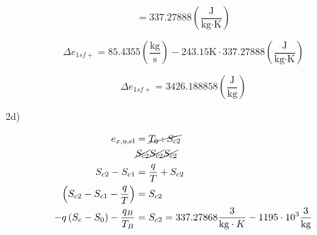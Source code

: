 \[
= 337.27888 \left( \frac{\text{J}}{\text{kg} \cdot \text{K}} \right)
\]

\[
\Delta e_{1sf+} = 85.4355 \left( \frac{\text{kg}}{\text{s}} \right) - 243.15 \text{K} \cdot 337.27888 \left( \frac{\text{J}}{\text{kg} \cdot \text{K}} \right)
\]

\[
\Delta e_{1sf+} = 3426.188858 \left( \frac{\text{J}}{\text{kg}} \right)
\]



2d)

\begin{align*}
e_{x, \text{u,el}} &= \cancel{T_0: S_{c2}} \\
& \cancel{S_{c2}} \cancel{S_{c2}} \cancel{S_{c2}} \\
S_{c2} - S_{c1} &= \frac{q}{T} + S_{c2} \\
\left( S_{c2} - S_{c1} - \frac{q}{T} \right) &= S_{c2} \\
- q \left( S_{c} - S_{0} \right) - \frac{q_B}{T_B} &= S_{c2} = 337.27868 \frac{3}{\text{kg} \cdot K} - 1195 \cdot 10^3 \frac{3}{\text{kg}} \\

\end{align*}
